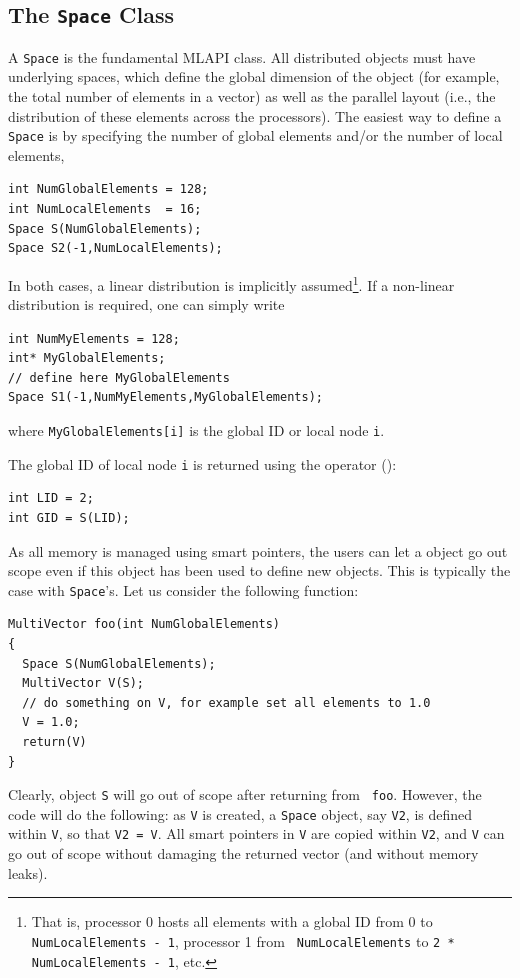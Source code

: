\documentclass{article}[11pt]
\newcommand{\MLAPI}  {{\sc MLAPI }}
\begin{document}
\subsection{The {\tt Space} Class}
\label{sec:space}

A {\tt Space} is the fundamental \MLAPI class. All distributed objects must have
underlying spaces, which define the global dimension of the object 
(for example, the total number of elements in a vector) as well as the
 parallel layout (i.e., the distribution of these elements across the
processors). The easiest way to define a {\tt Space} is by specifying the
number of global elements 
and/or the number of local elements,
\begin{verbatim}
int NumGlobalElements = 128;
int NumLocalElements  = 16;
Space S(NumGlobalElements);
Space S2(-1,NumLocalElements);
\end{verbatim}
In both cases, a linear distribution is implicitly 
assumed\footnote{That is, processor 0 hosts all elements with a global ID
  from 0 to {\tt NumLocalElements - 1}, processor 1 from {\tt
    NumLocalElements} to {\tt 2 * NumLocalElements - 1}, etc.}. If a non-linear
distribution is required, one can simply write
\begin{verbatim}
int NumMyElements = 128;
int* MyGlobalElements;
// define here MyGlobalElements
Space S1(-1,NumMyElements,MyGlobalElements);
\end{verbatim}
where {\tt MyGlobalElements[i]} is the global ID or local node {\tt i}.

The global ID of local node {\tt i} is returned using the operator ():
\begin{verbatim}
int LID = 2;
int GID = S(LID);
\end{verbatim}

\smallskip

As all memory is managed using smart pointers, the users can let a object go
out scope even if this object has been used to define new objects. This is
typically the case with {\tt Space}'s. Let us consider the following function:
\begin{verbatim}
MultiVector foo(int NumGlobalElements)
{
  Space S(NumGlobalElements);
  MultiVector V(S);
  // do something on V, for example set all elements to 1.0
  V = 1.0;
  return(V)
}
\end{verbatim}
Clearly, object {\tt S} will go out of scope after returning from {\tt
  foo}. However, the code will do the following:
as {\tt V} is created, a {\tt Space} object, say {\tt V2}, is defined
within {\tt V}, so that {\tt V2 = V}. All smart pointers in {\tt V} are copied
within {\tt V2}, and {\tt V} can go out of scope without damaging the
returned vector (and without memory leaks).
\end{document}

